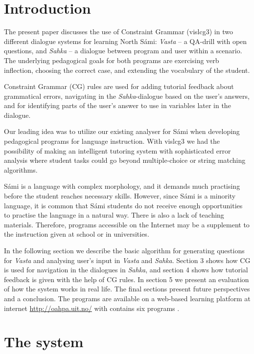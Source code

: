 \documentclass[11pt]{article}
\begin{document}
\section{Introduction} 

The present paper discusses the use of Constraint Grammar (vislcg3) in two different dialogue systems for learning North Sámi: \textit{Vasta} -- a QA-drill with open questions, and \textit{Sahka} -- a  dialogue between program and user within a scenario. The underlying pedagogical goals for both programs are exercising verb inflection, choosing the correct case, and extending the vocabulary of the student. 

Constraint Grammar (CG) rules are used for adding tutorial feedback about grammatical errors, navigating in the \textit{Sahka}-dialogue based on the user's answers, and for identifying parts of the user's answer to use in variables later in the dialogue. 

Our leading idea was to utilize our existing analyser for Sámi when developing pedagogical programs for language instruction. With vislcg3 we had the possibility of making an intelligent tutoring system with sophisticated error analysis where student tasks could go beyond multiple-choice or string matching algorithms. 

Sámi is a language with complex morphology, and it demands much practising before the student reaches necessary skills. However, since Sámi is a minority language, it is common that Sámi students do not receive enough opportunities to practise the language in a natural way. There is also a lack of teaching materials. Therefore, programs accessible on the Internet may be a supplement to the instruction given at school or in universities.

In the following section we describe the basic algorithm for generating questions for \textit{Vasta} and analysing user's input in \textit{Vasta} and \textit{Sahka}. Section 3 shows how CG is used for navigation in the dialogues in \textit{Sahka}, and section 4 shows how tutorial feedback is given with the help of CG rules. In section 5 we present an evaluation of how the system works in real life. The final sections present future perspectives and a conclusion. The programs are available on a web-based learning platform at internet \url{http://oahpa.uit.no/} with contains six programs \cite{Antonsen:09}.

\section{The system}
\end{document}
